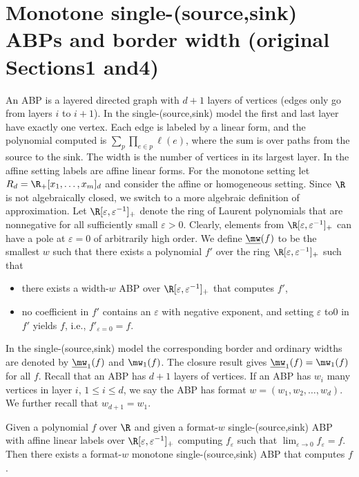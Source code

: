 \section*{Monotone single-(source,sink) ABPs and border width (original Sections1 and4)}
An ABP is a layered directed graph with $d+1$ layers of vertices (edges only go from layers $i$ to $i+1$). In the single-(source,sink) model the first and last layer have exactly one vertex. Each edge is labeled by a linear form, and the polynomial computed is $\sum_p\prod_{e\in p}\ell(e)$, where the sum is over paths from the source to the sink. The width is the number of vertices in its largest layer. In the affine setting labels are affine linear forms.
For the monotone setting let $R_d=\R_+[x_1,\ldots,x_m]_d$ and consider the affine or homogeneous setting. Since $\R$ is not algebraically closed, we switch to a more algebraic definition of approximation. Let $\R[\varepsilon,\varepsilon^{-1}]_+$ denote the ring of Laurent polynomials that are nonnegative for all sufficiently small $\varepsilon>0$. Clearly, elements from $\R[\varepsilon,\varepsilon^{-1}]_+$ can have a pole at $\varepsilon=0$ of arbitrarily high order. We define $\underline{\mw}(f)$ to be the smallest $w$ such that there exists a polynomial $f'$ over the ring $\R[\varepsilon,\varepsilon^{-1}]_+$ such that
\begin{itemize}
\item there exists a width-$w$ ABP over $\R[\varepsilon,\varepsilon^{-1}]_+$ that computes $f'$,
\item no coefficient in $f'$ contains an $\varepsilon$ with negative exponent, and setting $\varepsilon$ to0 in $f'$ yields $f$, i.e., $f'_{\varepsilon=0}=f$.
\end{itemize}
In the single-(source,sink) model the corresponding border and ordinary widths are denoted by $\underline{\mw}_1(f)$ and $\mw_1(f)$. The closure result gives $\underline{\mw}_1(f)=\mw_1(f)$ for all $f$.
Recall that an ABP has $d+1$ layers of vertices. If an ABP has $w_i$ many vertices in layer $i$, $1\le i\le d$, we say the ABP has format $w=(w_1,w_2,\ldots,w_d)$. We further recall that $w_{d+1}=w_1$.
\setcounter{theorem}{2}
\begin{theorem}\label{thm:monotone-closure}
Given a polynomial $f$ over $\R$ and given a format-$w$ single-(source,sink) ABP with affine linear labels over $\R[\varepsilon,\varepsilon^{-1}]_+$ computing $f_\varepsilon$ such that $\lim_{\varepsilon\to0}f_\varepsilon=f$. Then there exists a format-$w$ monotone single-(source,sink) ABP that computes $f$.
\end{theorem}
